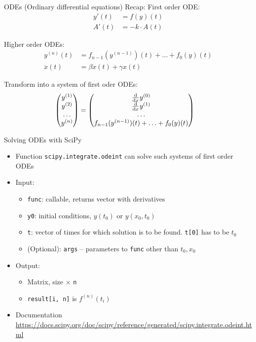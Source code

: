 \begin{frame}{ODEs (Ordinary differential equations)}
%
Recap: First order ODE:
\begin{align*}
	y'(t) &= f(y)(t)\\
	A'(t) &= -k \cdot A(t)
\end{align*}

Higher order ODEs:
\begin{align*}
	y^{(n)}(t) &= f_{n-1}(y^{(n-1)})(t) + \ldots + f_0(y)(t)\\
	\ddot{x}(t) &= \beta \dot{x}(t) + \gamma x(t)
\end{align*}

Transform into a system of first oder ODEs:
\begin{align*}
	\begin{pmatrix}
		y^{(1)} \\
		y^{(2)} \\
		\hdots \\
		y^{(n)}
	\end{pmatrix}
&=
	\begin{pmatrix}
		\dv{x} y^{(0)} \\
		\dv{x} y^{(1)} \\
		\hdots \\
		f_{n-1}(y^{(n-1)})(t) + \ldots + f_0(y)(t)
	\end{pmatrix}
\end{align*}
%
\end{frame}


\begin{frame}[fragile]{Solving ODEs with SciPy}
%
\begin{itemize}
\item Function \texttt{scipy.integrate.odeint} can solve such systems of first order ODEs
\item Input:
	\begin{itemize}
	\item \texttt{func}: callable, returns vector with derivatives
	\item \texttt{y0}: initial conditions, \ie $y(t_0)$ or $y(x_0, t_0)$
	\item \texttt{t}: vector of times for which solution is to be found. \texttt{t[0]} has to be $t_0$
	\item (Optional): \texttt{args} -- parameters to \texttt{func} other than $t_0, x_0$
	\end{itemize}
\item Output:
	\begin{itemize}
	\item Matrix, size  $\times$ \texttt{n}
	\item \texttt{result[i, n]} is $f^{(n)}(t_i)$
	\end{itemize}
\item Documentation\\
	{\scriptsize \url{https://docs.scipy.org/doc/scipy/reference/generated/scipy.integrate.odeint.html}}
\end{itemize}
%
\end{frame}

